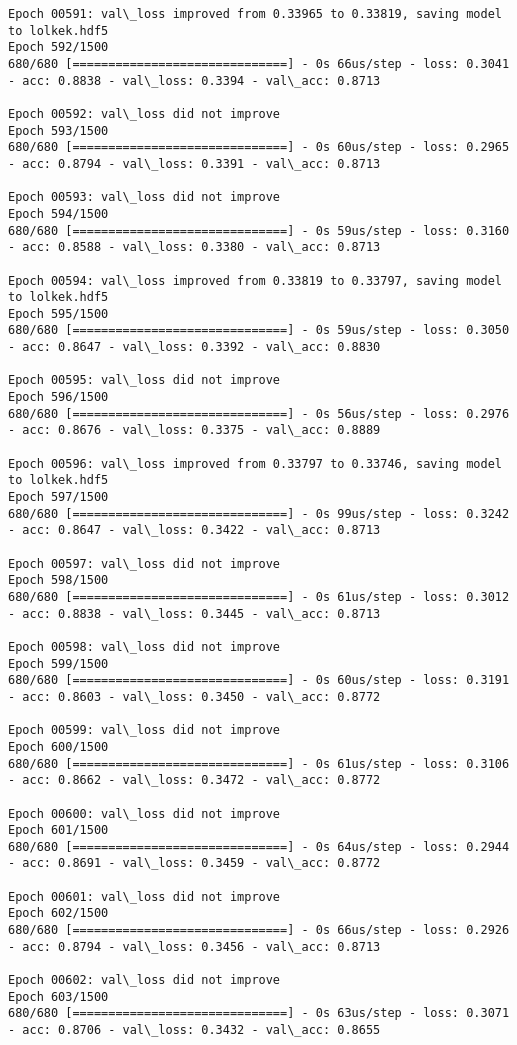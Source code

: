 \documentclass[11pt]{article}
\begin{document}
\begin{Verbatim}[commandchars=\\\{\}]
Epoch 00591: val\_loss improved from 0.33965 to 0.33819, saving model to lolkek.hdf5
Epoch 592/1500
680/680 [==============================] - 0s 66us/step - loss: 0.3041 - acc: 0.8838 - val\_loss: 0.3394 - val\_acc: 0.8713

Epoch 00592: val\_loss did not improve
Epoch 593/1500
680/680 [==============================] - 0s 60us/step - loss: 0.2965 - acc: 0.8794 - val\_loss: 0.3391 - val\_acc: 0.8713

Epoch 00593: val\_loss did not improve
Epoch 594/1500
680/680 [==============================] - 0s 59us/step - loss: 0.3160 - acc: 0.8588 - val\_loss: 0.3380 - val\_acc: 0.8713

Epoch 00594: val\_loss improved from 0.33819 to 0.33797, saving model to lolkek.hdf5
Epoch 595/1500
680/680 [==============================] - 0s 59us/step - loss: 0.3050 - acc: 0.8647 - val\_loss: 0.3392 - val\_acc: 0.8830

Epoch 00595: val\_loss did not improve
Epoch 596/1500
680/680 [==============================] - 0s 56us/step - loss: 0.2976 - acc: 0.8676 - val\_loss: 0.3375 - val\_acc: 0.8889

Epoch 00596: val\_loss improved from 0.33797 to 0.33746, saving model to lolkek.hdf5
Epoch 597/1500
680/680 [==============================] - 0s 99us/step - loss: 0.3242 - acc: 0.8647 - val\_loss: 0.3422 - val\_acc: 0.8713

Epoch 00597: val\_loss did not improve
Epoch 598/1500
680/680 [==============================] - 0s 61us/step - loss: 0.3012 - acc: 0.8838 - val\_loss: 0.3445 - val\_acc: 0.8713

Epoch 00598: val\_loss did not improve
Epoch 599/1500
680/680 [==============================] - 0s 60us/step - loss: 0.3191 - acc: 0.8603 - val\_loss: 0.3450 - val\_acc: 0.8772

Epoch 00599: val\_loss did not improve
Epoch 600/1500
680/680 [==============================] - 0s 61us/step - loss: 0.3106 - acc: 0.8662 - val\_loss: 0.3472 - val\_acc: 0.8772

Epoch 00600: val\_loss did not improve
Epoch 601/1500
680/680 [==============================] - 0s 64us/step - loss: 0.2944 - acc: 0.8691 - val\_loss: 0.3459 - val\_acc: 0.8772

Epoch 00601: val\_loss did not improve
Epoch 602/1500
680/680 [==============================] - 0s 66us/step - loss: 0.2926 - acc: 0.8794 - val\_loss: 0.3456 - val\_acc: 0.8713

Epoch 00602: val\_loss did not improve
Epoch 603/1500
680/680 [==============================] - 0s 63us/step - loss: 0.3071 - acc: 0.8706 - val\_loss: 0.3432 - val\_acc: 0.8655


\end{Verbatim}
\end{document}
